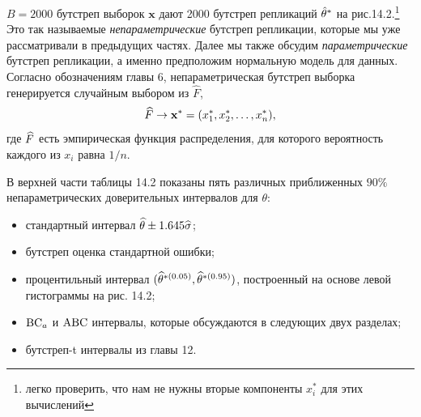\newline
$B = 2000$ бутстреп выборок $\mathbf x$ дают 2000 бутстреп репликаций $\hat \theta^*$ на рис.14.2.\footnote{легко проверить, что нам не нужны вторые компоненты $x_i^*$ для этих вычислений} Это так называемые \textit{непараметрические} бутстреп репликации, которые мы уже рассматривали в предыдущих частях. Далее мы также обсудим \textit{параметрические} бутстреп репликации, а именно предположим нормальную модель для данных. Согласно обозначениям главы 6, непараметрическая бутстреп выборка генерируется случайным выбором из $\widehat F$,
\begin{equation}
	\widehat F \rightarrow \mathbf x^* = (x_1^*,x_2^*,\ldots,x_{n}^*),
\end{equation}
\setcounter{equation}{4}
где $\widehat{F}$ есть эмпирическая функция распределения, для которого вероятность каждого из $x_i$ равна $1/n$.

В верхней части таблицы 14.2 показаны пять различных приближенных $90\%$ непараметрических доверительных интервалов для $\theta$: 
\begin{itemize}
	\item стандартный интервал $\widehat{\theta} \pm 1.645\widehat{\sigma}$;
	\item бутстреп оценка стандартной ошибки;
	\item процентильный интервал $(\widehat{\theta}^{*(0.05)}, \widehat{\theta}^{*(0.95)})$, построенный на основе левой гистограммы на рис. 14.2;
	\item $\mathrm{BC}_a$ и $\mathrm{ABC}$ интервалы, которые обсуждаются в следующих двух разделах;
	\item бутстреп-t интервалы из главы 12. 
\end{itemize}

